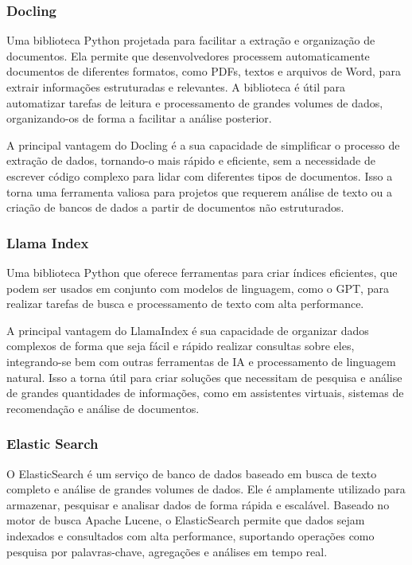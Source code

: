 \documentclass[a4paper, 12pt]{article}
\begin{document}
    \subsubsection{Docling}
    Uma biblioteca Python projetada para facilitar a extração e organização de documentos. Ela permite que desenvolvedores processem automaticamente documentos de diferentes formatos, como PDFs, textos e arquivos de Word, para extrair informações estruturadas e relevantes. A biblioteca é útil para automatizar tarefas de leitura e processamento de grandes volumes de dados, organizando-os de forma a facilitar a análise posterior.

    A principal vantagem do Docling é a sua capacidade de simplificar o processo de extração de dados, tornando-o mais rápido e eficiente, sem a necessidade de escrever código complexo para lidar com diferentes tipos de documentos. Isso a torna uma ferramenta valiosa para projetos que requerem análise de texto ou a criação de bancos de dados a partir de documentos não estruturados.

    \subsubsection{Llama Index}
    Uma biblioteca Python que oferece ferramentas para criar índices eficientes, que podem ser usados em conjunto com modelos de linguagem, como o GPT, para realizar tarefas de busca e processamento de texto com alta performance.

    A principal vantagem do LlamaIndex é sua capacidade de organizar dados complexos de forma que seja fácil e rápido realizar consultas sobre eles, integrando-se bem com outras ferramentas de IA e processamento de linguagem natural. Isso a torna útil para criar soluções que necessitam de pesquisa e análise de grandes quantidades de informações, como em assistentes virtuais, sistemas de recomendação e análise de documentos.

    \subsubsection{Elastic Search}
    O ElasticSearch é um serviço de banco de dados baseado em busca de texto completo e análise de grandes volumes de dados. Ele é amplamente utilizado para armazenar, pesquisar e analisar dados de forma rápida e escalável. Baseado no motor de busca Apache Lucene, o ElasticSearch permite que dados sejam indexados e consultados com alta performance, suportando operações como pesquisa por palavras-chave, agregações e análises em tempo real.
\end{document}
